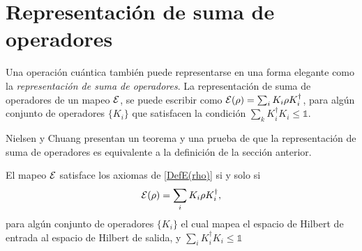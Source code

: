 \section{Representación de suma de operadores} %

Una operación cuántica también puede representarse en una forma elegante como la \textit{representación de suma de operadores}. La representación de suma de operadores de un mapeo $\mathcal{E}$, se puede escribir como $\mathcal{E}(\rho)=\sum_i K_i \rho K_i^\dagger$, para algún conjunto de operadores $\{K_i\}$ que satisfacen la condición $\sum_k K_i^\dagger K_i\le \mathds{1}$.

Nielsen y Chuang {\cite{nielsen_chuang_2010}} presentan un teorema y una prueba de que la representación de suma de operadores es equivalente a la definición de la sección anterior.

\begin{theorem}
    El mapeo $\mathcal{E}$ satisface los axiomas de {\ref{DefE(rho)}} si y solo si 
    \begin{equation}
        \mathcal{E}(\rho)=\sum_i K_i \rho K_i^\dagger,
    \end{equation}
    para algún conjunto de operadores $\{K_i\}$ el cual mapea el espacio de Hilbert de entrada al espacio de Hilbert de salida, y $\sum_i K_i^\dagger K_i\le \mathds{1}$
\end{theorem}


